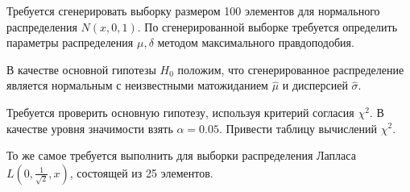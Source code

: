 Требуется сгенерировать выборку размером 100 элементов для нормального распределения $N(x, 0, 1)$. По сгенерированной выборке требуется определить параметры распределения $\mu, \delta$ методом максимального правдоподобия.

В качестве основной гипотезы $H_0$ положим, что сгенерированное распределение является нормальным с неизвестными матожиданием $\hat{\mu}$ и дисперсией $\hat{\sigma}$.

Требуется проверить основную гипотезу, используя критерий согласия $\chi^2$. В качестве уровня значимости взять $\alpha=0.05$. Привести таблицу вычислений $\chi^2$.

То же самое требуется выполнить для выборки распределения Лапласа $L(0, \frac{1}{\sqrt{2}}, x)$, состоящей из 25 элементов.
